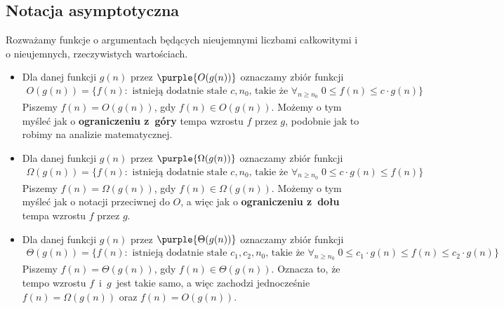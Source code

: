 \subsection{Notacja asymptotyczna}
Rozważamy funkcje o argumentach będących nieujemnymi liczbami całkowitymi i o nieujemnych, rzeczywistych wartościach.
\begin{itemize}
    \item Dla danej funkcji $g(n)$ przez $\purple{O(g(n))}$ oznaczamy zbiór funkcji
    \begin{align*}
        O(g(n)) = \{f(n): \text{ istnieją dodatnie stałe } c, n_0 \text{, takie że } \forall_{n \geq n_0} \; 0 \leq f(n) \leq c \cdot g(n) \}
    \end{align*}
    Piszemy $f(n) = O(g(n))$, gdy $f(n) \in O(g(n))$. Możemy o tym myśleć jak o \textbf{ograniczeniu z~góry} tempa wzrostu $f$ przez $g$, podobnie jak to robimy na analizie matematycznej.

    \item Dla danej funkcji $g(n)$ przez $\purple{\Omega(g(n))}$ oznaczamy zbiór funkcji
    \begin{align*}
        \Omega(g(n)) = \{f(n): \text{ istnieją dodatnie stałe } c, n_0 \text{, takie że } \forall_{n \geq n_0} \; 0 \leq c \cdot g(n) \leq f(n) \}
    \end{align*}
    Piszemy $f(n) = \Omega(g(n))$, gdy $f(n) \in \Omega(g(n))$. Możemy o tym myśleć jak o notacji przeciwnej do $O$, a więc jak o \textbf{ograniczeniu z~dołu} tempa wzrostu $f$ przez $g$.

    \item Dla danej funkcji $g(n)$ przez $\purple{\Theta(g(n))}$ oznaczamy zbiór funkcji
    \begin{align*}
        \Theta(g(n)) = \{f(n): \text{ istnieją dodatnie stałe } c_1, c_2, n_0 \text{, takie że } \forall_{n \geq n_0} \; 0 \leq c_1 \cdot g(n) \leq f(n) \leq c_2 \cdot g(n) \}
    \end{align*}
    Piszemy $f(n) = \Theta(g(n))$, gdy $f(n) \in \Theta(g(n))$. Oznacza to, że tempo wzrostu $f$~i~$g$~jest takie samo, a więc zachodzi jednocześnie $f(n) = \Omega(g(n))$ oraz $f(n) = O(g(n))$.
\end{itemize}

